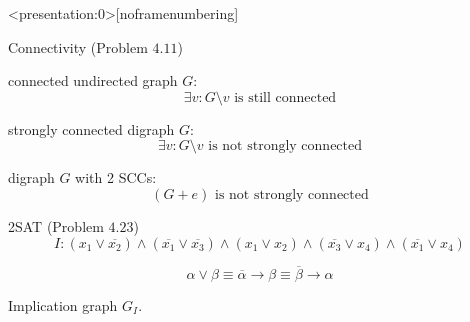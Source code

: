 \begin{frame}<presentation:0>[noframenumbering]
  \begin{exampleblock}{Connectivity (Problem $4.11$)}
	\begin{description}[Example:]
	  \item[Prove:] connected undirected graph $G$: 
		\[
		  \exists v: G \setminus v \text{ is still connected}
		\]
	  \item[Example:] strongly connected digraph $G$:
		\[
		  \exists v: G \setminus v \text{ is not strongly connected}
		\]
	  \item[Example:] digraph $G$ with 2 SCCs:
		\[
		  (G + e) \text{ is not strongly connected}
		\]
	\end{description}
  \end{exampleblock}
\end{frame}

\begin{frame}
  \begin{exampleblock}{2SAT (Problem $4.23$)}
    \[
      I: (x_1 \lor \overline{x_2}) \land (\overline{x_1} \lor \overline{x_3}) \land (x_1 \lor x_2) \land (\overline{x_3} \lor x_4) \land (\overline{x_1} \lor x_4)
    \]
  \end{exampleblock}

  \pause
  \[
    \alpha \lor \beta \equiv \overline{\alpha} \to \beta \equiv \overline{\beta} \to \alpha
  \]

  \pause
  \begin{center}
    Implication graph $G_I$.
  \end{center}

  \pause
\end{frame}

